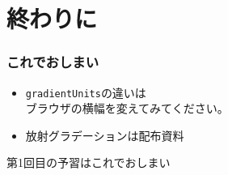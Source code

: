 \section{終わりに}
\begin{frame}
 \frametitle{これでおしまい}
 \begin{itemize}
	\item  \texttt{gradientUnits}の違いは\\
				 ブラウザの横幅を変えてみてください。
	\item  放射グラデーションは配布資料
 \end{itemize}

 第1回目の予習はこれでおしまい
\end{frame}

\begin{frame}[containsverbatim]
\frametitle{}
\end{frame}

